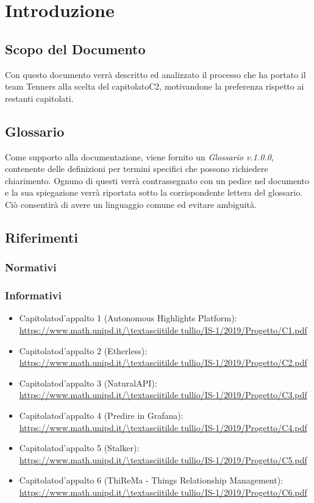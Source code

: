 \section{Introduzione}

\subsection{Scopo del Documento}
Con questo documento verrà descritto ed analizzato il processo che ha portato il team Tenners alla scelta del capitolato\glo C2, motivandone la preferenza rispetto ai restanti capitolati.
	
\subsection{Glossario}
Come supporto alla documentazione, viene fornito un \textit{Glossario v.1.0.0}, contenente delle definizioni per termini specifici che possono richiedere chiarimento. Ognuno di questi verrà contrassegnato con un pedice \glo nel documento e la sua spiegazione verrà riportata sotto la corrispondente lettera del glossario. Ciò consentirà di avere un linguaggio comune ed evitare ambiguità. 
	
\subsection{Riferimenti}
\subsubsection{Normativi}
\subsubsection{Informativi}
\begin{itemize}
    \item Capitolato\glo d'appalto 1 (Autonomous Highlights Platform):\\ 
    \url{https://www.math.unipd.it/\textasciitilde tullio/IS-1/2019/Progetto/C1.pdf}
    \item Capitolato\glo d'appalto 2 (Etherless):\\ 
	\url{https://www.math.unipd.it/\textasciitilde tullio/IS-1/2019/Progetto/C2.pdf}
    \item Capitolato\glo d'appalto 3 (NaturalAPI):\\ 
    \url{https://www.math.unipd.it/\textasciitilde tullio/IS-1/2019/Progetto/C3.pdf}
    \item Capitolato\glo d'appalto 4 (Predire in Grafana):\\ 
    \url{https://www.math.unipd.it/\textasciitilde tullio/IS-1/2019/Progetto/C4.pdf}
    \item Capitolato\glo d'appalto 5 (Stalker):\\ 
    \url{https://www.math.unipd.it/\textasciitilde tullio/IS-1/2019/Progetto/C5.pdf}
    \item Capitolato\glo d'appalto 6 (ThiReMa - Things Relationship Management):\\ 
    \url{https://www.math.unipd.it/\textasciitilde tullio/IS-1/2019/Progetto/C6.pdf}
\end{itemize}

	
	

